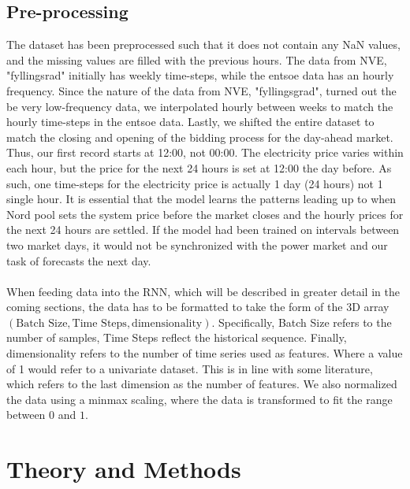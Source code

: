 \documentclass
[twocolumn,
secnumarabic,
nobibnotes,
aps,
prl,
reprint,
groupedaddress,
amsmath,
amssymb,
]{revtex4-2}
\begin{document}
\subsection{Pre-processing}
The dataset has been preprocessed such that it does not contain any NaN values, and the missing values are filled with the previous hours. The data from NVE, "fyllingsrad" initially has weekly time-steps, while the entsoe data has an hourly frequency. Since the nature of the data from NVE, "fyllingsgrad", turned out the be very low-frequency data, we interpolated hourly between weeks to match the hourly time-steps in the entsoe data. Lastly, we shifted the entire dataset to match the closing and opening of the bidding process for the day-ahead market. Thus, our first record starts at 12:00, not 00:00. The electricity price varies within each hour, but the price for the next 24 hours is set at 12:00 the day before. As such, one time-steps for the electricity price is actually 1 day (24 hours) not 1 single hour. It is essential that the model learns the patterns leading up to when Nord pool sets the system price before the market closes and the hourly prices for the next 24 hours are settled. If the model had been trained on intervals between two market days, it would not be synchronized with the power market and our task of forecasts the next day.
\\\\
When feeding data into the RNN, which will be described in greater detail in the coming sections, the data has to be formatted to take the form of the 3D array $\left(\text{Batch Size}, \text{Time Steps}, \text{dimensionality}\right)$. Specifically, Batch Size refers to the number of samples, Time Steps reflect the historical sequence. Finally, dimensionality refers to the number of time series used as features. Where a value of 1 would refer to a univariate dataset. This is in line with some literature, which refers to the last dimension as the number of features. We also normalized the data using a minmax scaling, where the data is transformed to fit the range between $0$ and $1$.

\section{Theory and Methods}
\end{document}
